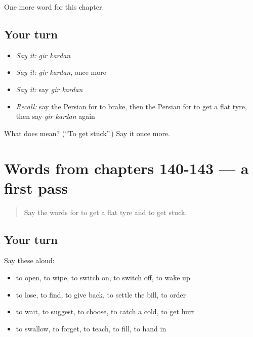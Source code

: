 \begin{grammarlens}[title={What you've built}]
One more word for this chapter.
\end{grammarlens}

\subsection*{Your turn}
\begin{itemize}
\raggedright
  \item \emph{Say it:} \emph{gir kardan}
  \item \emph{Say it:} \emph{gir kardan}, once more
  \item \emph{Say it:} say \emph{gir kardan}
  \item \emph{Recall:} say the Persian for to brake, then the Persian for to get a flat tyre, then say \emph{gir kardan} again
\end{itemize}

\begin{tcolorbox}[breakable,colback=teal!4,colframe=teal!35!black,title={Before you move on}]
What does   mean? (\textquotedblleft{}To get stuck\textquotedblright{}.) Say it once more.
\end{tcolorbox}
\section[(dialogue)]{Words from chapters 140-143 — a first pass}

\label{lesson:FA-R148-first-pass-words-from-chapters-140-143}



\begin{quote}
Say the words for to get a flat tyre and to get stuck.
\end{quote}

\subsection*{Your turn}
Say these aloud:

\begin{itemize}
\raggedright
  \item to open, to wipe, to switch on, to switch off, to wake up
  \item to lose, to find, to give back, to settle the bill, to order
  \item to wait, to suggest, to choose, to catch a cold, to get hurt
  \item to swallow, to forget, to teach, to fill, to hand in
\end{itemize}

